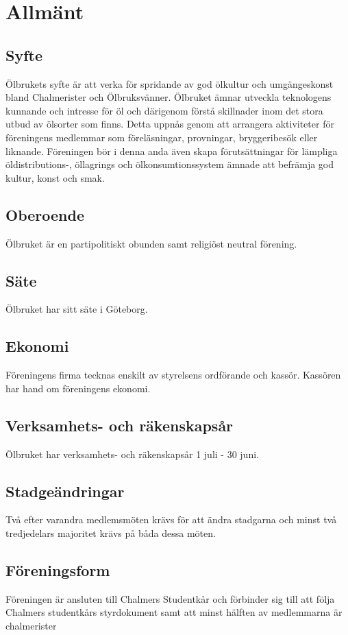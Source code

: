 \section{Allmänt}

\subsection{Syfte}
Ölbrukets syfte är att verka för spridande av god ölkultur och umgängeskonst bland Chalmerister och Ölbruksvänner. Ölbruket ämnar utveckla teknologens kunnande och intresse för öl och därigenom förstå skillnader inom det stora utbud av ölsorter som finns. Detta uppnås genom att arrangera aktiviteter för föreningens medlemmar som föreläsningar, provningar, bryggeribesök eller liknande. Föreningen bör i denna anda även skapa förutsättningar för lämpliga öldistributions-, öllagrings och ölkonsumtionssystem ämnade att befrämja god kultur, konst och smak.

\subsection{Oberoende}
Ölbruket är en partipolitiskt obunden samt religiöst neutral förening.

\subsection{Säte}
Ölbruket har sitt säte i Göteborg.

\subsection{Ekonomi}
Föreningens firma tecknas enskilt av styrelsens ordförande och kassör. Kassören har hand om föreningens ekonomi.

\subsection{Verksamhets- och räkenskapsår}
Ölbruket har verksamhets- och räkenskapsår 1 juli - 30 juni.

\subsection{Stadgeändringar}
Två efter varandra medlemsmöten krävs för att ändra stadgarna och minst två tredjedelars majoritet krävs på båda dessa möten.

\subsection{Föreningsform}
Föreningen är ansluten till Chalmers Studentkår och förbinder sig till att följa Chalmers studentkårs styrdokument samt att minst hälften av medlemmarna är chalmerister
